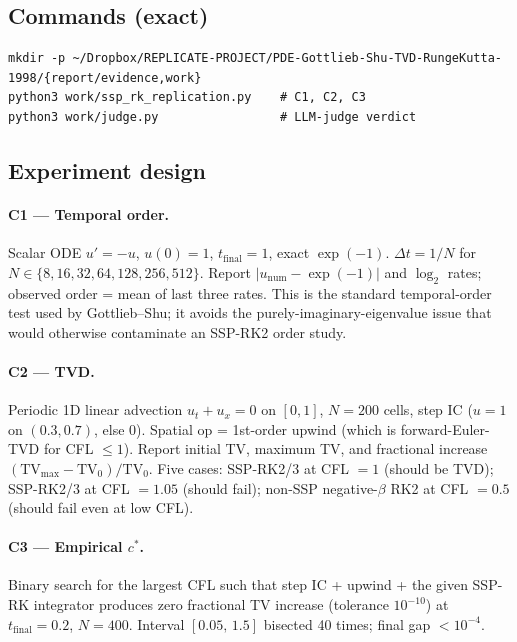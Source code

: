 \documentclass[11pt]{article}
\begin{document}
\subsection{Commands (exact)}
\begin{lstlisting}
mkdir -p ~/Dropbox/REPLICATE-PROJECT/PDE-Gottlieb-Shu-TVD-RungeKutta-1998/{report/evidence,work}
python3 work/ssp_rk_replication.py    # C1, C2, C3
python3 work/judge.py                 # LLM-judge verdict
\end{lstlisting}

\subsection{Experiment design}

\paragraph{C1 --- Temporal order.} Scalar ODE $u' = -u$, $u(0)=1$,
$t_{\mathrm{final}}=1$, exact $\exp(-1)$. $\Delta t = 1/N$ for
$N \in \{8,16,32,64,128,256,512\}$. Report $|u_{\mathrm{num}} - \exp(-1)|$
and $\log_{2}$ rates; observed order = mean of last three rates. This is
the standard temporal-order test used by Gottlieb--Shu; it avoids the
purely-imaginary-eigenvalue issue that would otherwise contaminate an
SSP-RK2 order study.

\paragraph{C2 --- TVD.} Periodic 1D linear advection $u_{t} + u_{x} = 0$
on $[0,1]$, $N=200$ cells, step IC ($u=1$ on $(0.3,0.7)$, else $0$).
Spatial op = 1st-order upwind (which is forward-Euler-TVD for CFL $\le
1$). Report initial TV, maximum TV, and fractional increase
$(\mathrm{TV}_{\max}-\mathrm{TV}_{0})/\mathrm{TV}_{0}$. Five cases:
SSP-RK2/3 at CFL $= 1$ (should be TVD); SSP-RK2/3 at CFL $= 1.05$
(should fail); non-SSP negative-$\beta$ RK2 at CFL $= 0.5$ (should fail
even at low CFL).

\paragraph{C3 --- Empirical $c^{\ast}$.} Binary search for the largest
CFL such that step IC + upwind + the given SSP-RK integrator produces
zero fractional TV increase (tolerance $10^{-10}$) at
$t_{\mathrm{final}}=0.2$, $N=400$. Interval $[0.05,\,1.5]$ bisected 40
times; final gap $< 10^{-4}$.
\end{document}
